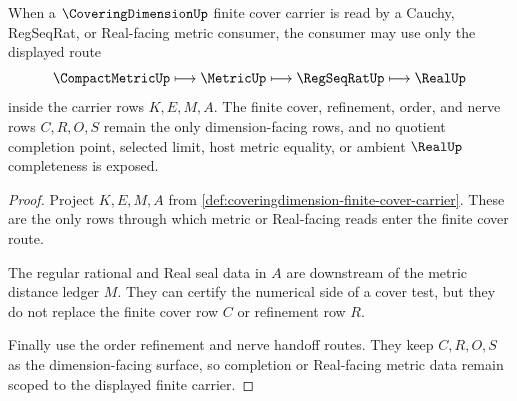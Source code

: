 \begin{theorem}
\label{thm:coveringdimension-cauchy-metric-scope}
When a $\CoveringDimensionUp$ finite cover carrier is read by a Cauchy, RegSeqRat, or Real-facing metric consumer, the consumer may use only the displayed route
$$
\CompactMetricUp
\longmapsto
\MetricUp
\longmapsto
\RegSeqRatUp
\longmapsto
\RealUp
$$
inside the carrier rows $K,E,M,A$. The finite cover, refinement, order, and nerve rows $C,R,O,S$ remain the only dimension-facing rows, and no quotient completion point, selected limit, host metric equality, or ambient $\RealUp$ completeness is exposed.
\end{theorem}
\begin{proof}
Project $K,E,M,A$ from \autoref{def:coveringdimension-finite-cover-carrier}. These are the only rows through which metric or Real-facing reads enter the finite cover route.

The regular rational and Real seal data in $A$ are downstream of the metric distance ledger $M$. They can certify the numerical side of a cover test, but they do not replace the finite cover row $C$ or refinement row $R$.

Finally use the order refinement and nerve handoff routes. They keep $C,R,O,S$ as the dimension-facing surface, so completion or Real-facing metric data remain scoped to the displayed finite carrier.
\end{proof}

